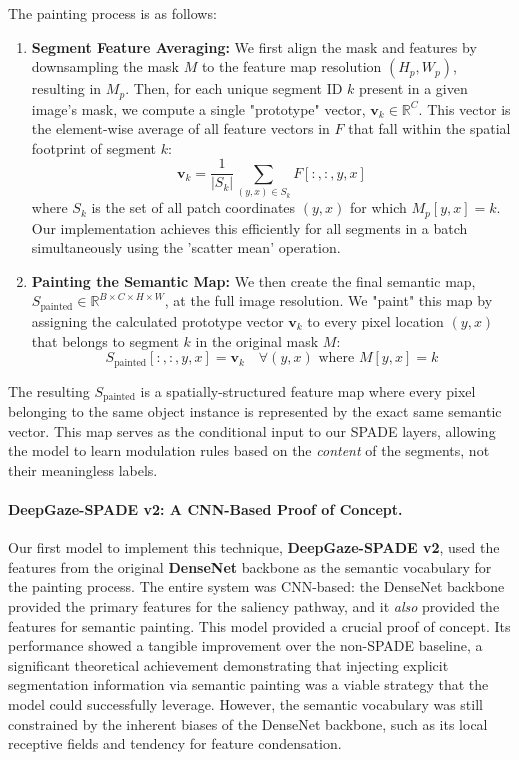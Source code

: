 The painting process is as follows:
\begin{enumerate}
    \item \textbf{Segment Feature Averaging:} We first align the mask and features by downsampling the mask $M$ to the feature map resolution $(H_p, W_p)$, resulting in $M_p$. Then, for each unique segment ID $k$ present in a given image's mask, we compute a single "prototype" vector, $\mathbf{v}_k \in \mathbb{R}^{C}$. This vector is the element-wise average of all feature vectors in $F$ that fall within the spatial footprint of segment $k$:
    \begin{equation}
    \mathbf{v}_k = \frac{1}{|S_k|} \sum_{(y,x) \in S_k} F[:, :, y, x]
    \end{equation}
    where $S_k$ is the set of all patch coordinates $(y,x)$ for which $M_p[y,x] = k$. Our implementation achieves this efficiently for all segments in a batch simultaneously using the 'scatter mean' operation.

    \item \textbf{Painting the Semantic Map:} We then create the final semantic map, $S_{\text{painted}} \in \mathbb{R}^{B \times C \times H \times W}$, at the full image resolution. We "paint" this map by assigning the calculated prototype vector $\mathbf{v}_k$ to every pixel location $(y,x)$ that belongs to segment $k$ in the original mask $M$:
    \begin{equation}
    S_{\text{painted}}[:, :, y, x] = \mathbf{v}_k \quad \forall (y,x) \text{ where } M[y,x] = k
    \end{equation}
\end{enumerate}
The resulting $S_{\text{painted}}$ is a spatially-structured feature map where every pixel belonging to the same object instance is represented by the exact same semantic vector. This map serves as the conditional input to our SPADE layers, allowing the model to learn modulation rules based on the \textit{content} of the segments, not their meaningless labels.

\paragraph{DeepGaze-SPADE v2: A CNN-Based Proof of Concept.}
Our first model to implement this technique, \textbf{DeepGaze-SPADE v2}, used the features from the original \textbf{DenseNet} backbone as the semantic vocabulary for the painting process. The entire system was CNN-based: the DenseNet backbone provided the primary features for the saliency pathway, and it \textit{also} provided the features for semantic painting. This model provided a crucial proof of concept. Its performance showed a tangible improvement over the non-SPADE baseline, a significant theoretical achievement demonstrating that injecting explicit segmentation information via semantic painting was a viable strategy that the model could successfully leverage. However, the semantic vocabulary was still constrained by the inherent biases of the DenseNet backbone, such as its local receptive fields and tendency for feature condensation.


